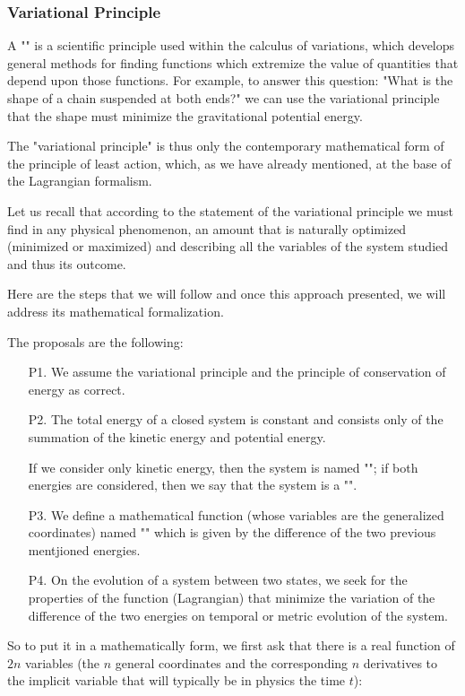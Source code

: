 	\subsubsection{Variational Principle}
	A "" is a scientific principle used within the calculus of variations, which develops general methods for finding functions which extremize the value of quantities that depend upon those functions. For example, to answer this question: "What is the shape of a chain suspended at both ends?" we can use the variational principle that the shape must minimize the gravitational potential energy.
	
	The "variational principle" is thus only the contemporary mathematical form of the principle of least action, which, as we have already mentioned, at the base of the Lagrangian formalism.
	
	Let us recall that according to the statement of the variational principle we must find in any physical phenomenon, an amount that is naturally optimized (minimized or maximized) and describing all the variables of the system studied and thus its outcome.
	
	Here are the steps that we will follow and once this approach presented, we will address its mathematical formalization.
	
	The proposals are the following:
	\begin{enumerate}
		\item[P1.] We assume the variational principle and the principle of conservation of energy as correct.

		\item[P2.] The total energy of a closed system is constant and consists only of the summation of the kinetic energy and potential energy.

		If we consider only kinetic energy, then the system is named ""; if both energies are considered, then we say that the system is a "".

		\item[P3.] We define a mathematical function (whose variables are the generalized coordinates) named "" which is given by the difference of the two previous mentjioned energies.

		\item[P4.] On the evolution of a system between two states, we seek for the properties of the function (Lagrangian) that minimize the variation of the difference of the two energies on temporal or metric evolution of the system.
	\end{enumerate}
	So to put it in a mathematically form, we first ask that there is a real function of $2n$ variables (the $n$ general coordinates and the corresponding $n$ derivatives to the implicit variable that will typically be in physics the time $t$):
	
